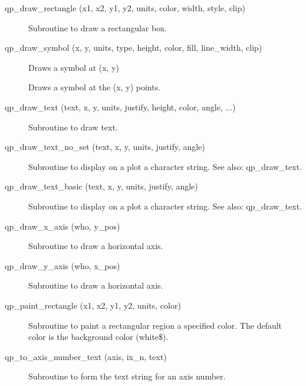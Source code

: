 \begin{description}
\label{r:qp.draw.rectangle}
\item[qp_draw_rectangle (x1, x2, y1, y2, units, color, width, style, clip)] \Newline 
     Subroutine to draw a rectangular box.

\label{r:qp.draw.symbol}
\item[qp_draw_symbol (x, y, units, type, height, color, fill, line_width, clip)] \Newline 
     Draws a symbol at (x, y) 

\label{r:qp.draw.symbols}
\item[\protect\parbox{6in}{qp_draw_symbols (x, y, units, type, height, color, \\
  \hspace*{2in} fill, line_width, clip, symbol_every)} ] \Newline 
     Draws a symbol at the (x, y) points. 

\label{r:qp.draw.text}
\item[qp_draw_text (text, x, y, units, justify, height, color, angle, ...)] \Newline 
     Subroutine to draw text.

\label{r:qp.draw.text.no.set}
\item[qp_draw_text_no_set (text, x, y, units, justify, angle)] \Newline 
Subroutine to display on a plot a character string.
See also: qp_draw_text.

\label{r:qp.draw.text.basic}
\item[qp_draw_text_basic (text, x, y, units, justify, angle)] \Newline 
     Subroutine to display on a plot a character string.
     See also: qp_draw_text.

\label{r:qp.draw.x.axis}
\item[qp_draw_x_axis (who, y_pos)] \Newline 
     Subroutine to draw a horizontal axis.

\label{r:qp.draw.y.axis}
\item[qp_draw_y_axis (who, x_pos)] \Newline 
     Subroutine to draw a horizontal axis.

\label{r:qp.paint.rectangle}
\item[qp_paint_rectangle (x1, x2, y1, y2, units, color)] \Newline 
Subroutine to paint a rectangular region a specified color.
The default color is the background color (white\$).

\label{r:qp.to.axis.number.text}
\item[qp_to_axis_number_text (axis, ix_n, text)] \Newline 
     Subroutine to form the text string for an axis number.

\end{description}

